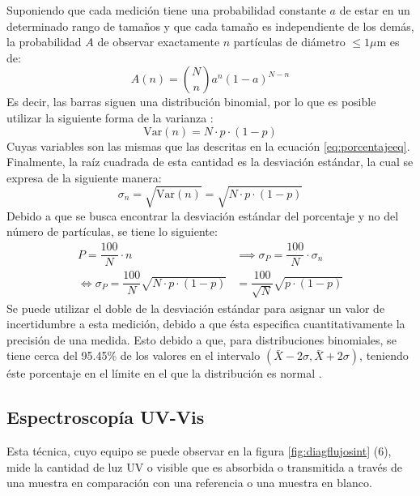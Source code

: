 \documentclass[../main.tex]{subfiles}
\begin{document}
Suponiendo que cada medición tiene una probabilidad constante $a$ de estar en un determinado rango de tamaños y que cada tamaño es independiente de los demás, la probabilidad $A$ de observar exactamente $n$ partículas de diámetro $\leq 1\mu$m es de:
\begin{equation}
    A(n)=\binom{N}{n}a^n(1-a)^{N-n}
    \label{eq:binomdist}
\end{equation}
Es decir, las barras siguen una distribución binomial, por lo que es posible utilizar la siguiente forma de la varianza \cite{Stephenson2005}:
\begin{equation}
    \text{Var}(n)=N\cdot p\cdot(1-p)
    \label{eq:varianza}
\end{equation}
Cuyas variables son las mismas que las descritas en la ecuación \ref{eq:porcentajeeq}. Finalmente, la raíz cuadrada de esta cantidad es la desviación estándar, la cual se expresa de la siguiente manera:
\begin{equation}
    \sigma_n=\sqrt{\text{Var}(n)}=\sqrt{N\cdot p\cdot(1-p)}
    \label{eq:desviacionsinescalar}
\end{equation}
Debido a que se busca encontrar la desviación estándar del porcentaje y no del número de partículas, se tiene lo siguiente:
\begin{equation}
    \begin{split}
        P=\dfrac{100}{N}\cdot n&\implies\sigma_P=\dfrac{100}{N}\cdot\sigma_n\\
        \iff \sigma_P=\dfrac{100}{N}\sqrt{N\cdot p\cdot(1-p)}&=\dfrac{100}{\sqrt{N}}\sqrt{p\cdot(1-p)}
    \end{split}
    \label{eq:desvest}
\end{equation}
Se puede utilizar el doble de la desviación estándar para asignar un valor de incertidumbre a esta medición, debido a que ésta especifica cuantitativamente la precisión de una medida. Esto debido a que, para distribuciones binomiales, se tiene cerca del 95.45\% de los valores en el intervalo $(\bar{X}-2\sigma,\bar{X}+2\sigma)$, teniendo éste porcentaje en el límite en el que la distribución es normal \cite{bertaoda}.
\subsection{Espectroscopía UV-Vis}\label{sec:uvvismetod}
Esta técnica, cuyo equipo se puede observar en la figura \ref{fig:diagflujosint} (6), mide la cantidad de luz UV o visible que es absorbida o transmitida a través de una muestra en comparación con una referencia o una muestra en blanco.
\end{document}
